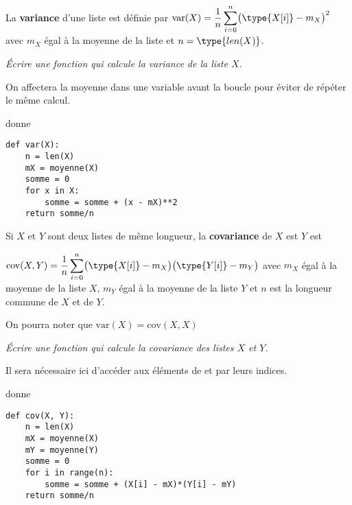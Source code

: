 La {\bf variance} d'une liste est définie par $\displaystyle \text{var}(X) =  \frac 1n \sum_{i=0}^n \bigl(\type{X[i]} -m_X\bigr)^2$ avec $m_X$ égal à la moyenne de la liste et $n = \type{len(X)}$.
\begin{Exercise}[title = Variance]
\it Écrire une fonction  qui calcule la variance de la liste $X$.

On affectera la moyenne dans une variable avant la boucle pour éviter de répéter le même calcul.

 donne 
\end{Exercise}
\begin{Answer}
\begin{lstlisting}
def var(X):
    n = len(X)
    mX = moyenne(X)
    somme = 0
    for x in X:
        somme = somme + (x - mX)**2
    return somme/n
\end{lstlisting}
\end{Answer}
\bigskip

Si $X$ et $Y$ sont deux listes de même longueur, la {\bf covariance} de $X$ est $Y$ est 

$\displaystyle \text{cov}(X, Y) =  \frac 1n \sum_{i=0}^n \bigl(\type{X[i]} -m_X\bigr)\bigl(\type{Y[i]} -m_Y\bigr)$ avec $m_X$ égal à la moyenne de la liste $X$, $m_Y$ égal à la moyenne de la liste $Y$ et $n$ est la longueur commune de $X$ et de $Y$.

On pourra noter que $\text{var}(X) = \text{cov}(X, X)$
\begin{Exercise}[title = Covariance]
\it Écrire une fonction  qui calcule la covariance des listes $X$ et $Y$.

Il sera nécessaire ici d'accéder aux éléments de  et  par leurs indices.

 donne 
\end{Exercise}
\begin{Answer}
\begin{lstlisting}
def cov(X, Y):
    n = len(X)
    mX = moyenne(X)
    mY = moyenne(Y)
    somme = 0
    for i in range(n):
        somme = somme + (X[i] - mX)*(Y[i] - mY)
    return somme/n
\end{lstlisting}
\end{Answer}
\bigskip


